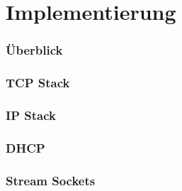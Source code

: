 \chapter{Implementierung}

\subsection{Überblick}


\subsection{TCP Stack}

\subsection{IP Stack}

\subsection{DHCP}

\subsection{Stream Sockets}

